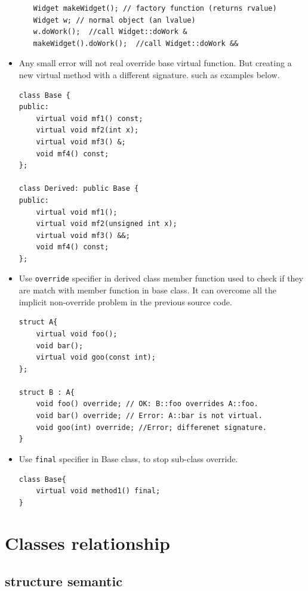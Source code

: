 \documentclass[a4paper,11pt,twoside]{book}
\begin{document}
\begin{itemize}
\begin{enumerate}
\begin{lstlisting}
Widget makeWidget(); // factory function (returns rvalue)
Widget w; // normal object (an lvalue)
w.doWork();  //call Widget::doWork &
makeWidget().doWork();  //call Widget::doWork &&
	\end{lstlisting}

	\end{enumerate}
	
\item Any small error will not real override base virtual function. But creating a new virtual method with a different signature. such as examples below.

\begin{lstlisting}[numbers=none]
class Base {
public:
	virtual void mf1() const;
	virtual void mf2(int x);
	virtual void mf3() &;
	void mf4() const;
};

class Derived: public Base {
public:
	virtual void mf1();
	virtual void mf2(unsigned int x);
	virtual void mf3() &&;
	void mf4() const;
};
\end{lstlisting}
	
	\item Use \texttt{override} specifier in derived class member function used to check if they are match with member function in base class. It can overcome all the implicit non-override problem in the previous source code.
\begin{lstlisting}[numbers=none]
struct A{
	virtual void foo();
	void bar();
	virtual void goo(const int);
};
	
struct B : A{
	void foo() override; // OK: B::foo overrides A::foo.
	void bar() override; // Error: A::bar is not virtual.
	void goo(int) override; //Error; differenet signature. 
}
\end{lstlisting}
	
    \item Use \texttt{final} specifier in Base class, to stop sub-class override.
\begin{lstlisting}[numbers=none]
class Base{
	virtual void method1() final;
}
\end{lstlisting}
	
\end{itemize}

\section{Classes relationship}

\subsection{structure semantic}
\end{document}
